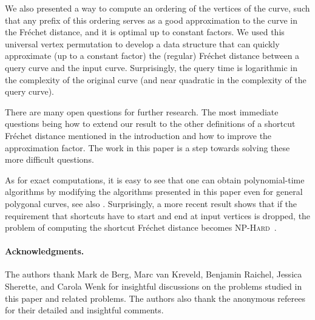 \documentclass[12pt]{article}
\providecommand{\ComplexityClass}[1]{{{\textcolor[named]{OliveGreen}{\textsc{#1}}}}}
\providecommand{\NPHard}{{\ComplexityClass{NP-Hard}}\index{NP!hard}\xspace}
\newcommand{\Frechet}{Fr\'{e}c{h}e{}t\xspace}\providecommand{\Arr}{\mathop{\mathrm{\EuScript{A}}}}
\numberwithin{figure}{section}
\numberwithin{equation}{section}
\begin{document}
We also presented a way to compute an ordering of the vertices of the
curve, such that any prefix of this ordering serves as a good
approximation to the curve in the \Frechet distance, and it is optimal
up to constant factors.
We used this universal vertex permutation to develop a data
structure that can quickly approximate (up to a constant factor) the
(regular) \Frechet distance between a query curve and the input
curve. Surprisingly, the query time is logarithmic in the complexity
of the original curve (and near quadratic in the complexity of the
query curve).

There are many open questions for further research. The most immediate
questions being how to extend our result to the other definitions of a
shortcut \Frechet distance mentioned in the introduction and how to
improve the approximation factor. The work in this paper is a step
towards solving these more difficult questions.  

As for exact computations, it is easy to see that one can obtain
polynomial-time algorithms by modifying the algorithms presented in this paper
even for general polygonal curves, see also \cite{d-raapg-13}.
Surprisingly, a more recent result shows that if the requirement that
shortcuts have to start and end at input vertices is dropped, the
problem of computing the shortcut \Frechet distance becomes
\NPHard~\cite{bds-jnp-13, d-raapg-13}.




\paragraph*{Acknowledgments.}

The authors thank Mark d{}e Berg, Marc van Kreveld, Benjamin Raichel,
Jessica Sherette, and Carola Wenk for insightful discussions on the
problems studied in this paper and related problems.  The authors also
thank the anonymous referees for their detailed and insightful
comments.


\end{document}
